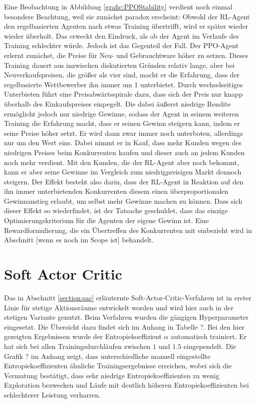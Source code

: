 Eine Beobachtung in Abbildung \ref{grafic:PPOStability} verdient noch einmal besondere Beachtung, weil sie zunächst paradox erscheint:
Obwohl der RL-Agent den regelbasierten Agenten nach etwas Training übertrifft, wird er später wieder wieder überholt.
Das erweckt den Eindruck, als ob der Agent im Verlaufe des Training schlechter würde.
Jedoch ist das Gegenteil der Fall.
Der PPO-Agent erlernt zunächst, die Preise für Neu- und Gebrauchtware höher zu setzen.
Dieses Training dauert aus inzwischen diskutierten Gründen relativ lange, aber bei Neuverkaufspreisen, die größer als vier sind, macht er die Erfahrung, dass der regelbasierte Wettbewerber ihn immer um 1 unterbietet.
Durch wechselseitiges Unterbieten führt eine Preisabwärtsspirale dazu, dass sich der Preis nur knapp überhalb des Einkaufspreises einpegelt.
Die dabei äußerst niedrige Rendite ermöglicht jedoch nur niedrige Gewinne, sodass der Agent in seinem weiteren Training die Erfahrung macht, dass er seinen Gewinn steigern kann, indem er seine Preise höher setzt.
Er wird dann zwar immer noch unterboten, allerdings nur um den Wert eins.
Dabei nimmt er in Kauf, dass mehr Kunden wegen des niedrigen Preises beim Konkurrenten kaufen und dieser auch an jedem Kunden noch mehr verdient.
Mit den Kunden, die der RL-Agent aber noch bekommt, kann er aber seine Gewinne im Vergleich zum niedrigpreisigen Markt dennoch steigern.
Der Effekt besteht also darin, dass der RL-Agent in Reaktion auf den ihn immer unterbietenden Konkurrenten diesem einen überproportionalen Gewinnanstieg erlaubt, um selbst mehr Gewinne machen zu können.
Dass sich dieser Effekt so wiederfindet, ist der Tatsache geschuldet, dass das einzige Optimierungskriterium für die Agenten der eigene Gewinn ist.
Eine Rewardformulierung, die ein Übertreffen des Konkurrenten mit einbezieht wird in Abschnitt [wenn es noch im Scope ist] behandelt.

\section{Soft Actor Critic}
Das in Abschnitt \ref{section:sac} erläuternte Soft-Actor-Critic-Verfahren ist in erster Linie für stetige Aktionsräume entwickelt worden und wird hier auch in der stetigen Variante genutzt.
Beim Verfahren wurden die gängigen Hyperparameter eingesetzt.
Die Übersicht dazu findet sich im Anhang in Tabelle ?.
Bei den hier gezeigten Ergebnissen wurde der Entropiekoeffizient $\alpha$ automatisch trainiert.
Er hat sich bei allen Trainingsdurchläufen zwischen $1$ und $1.5$ eingependelt.
Die Grafik ? im Anhang zeigt, dass unterschiedliche manuell eingestellte Entropiekoeffizienten ähnliche Trainingsergebnisse erreichen, wobei sich die Vermutung bestätigt, dass sehr niedrige Entropiekoeffizienten zu wenig Exploration bezwecken und Läufe mit deutlich höheren Entropiekoeffizienten bei schlechterer Leistung verharren.

